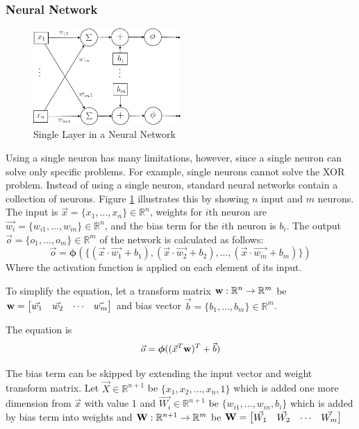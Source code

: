 \documentclass[draft,dvipsnames]{drexel-thesis}
\begin{document}
\begin{thesis}
\subsubsection{Neural Network}\label{subsubsec:NN}

\begin{figure}[t!]
    \centering
    \includegraphics[width=0.5\textwidth]{pictures/figures/detail_NN.png}
    \caption{Single Layer in a Neural Network}
    \label{fig:detail_NN}
\end{figure}

Using a single neuron has many limitations, however, since a single neuron can solve only specific problems. For example, single neurons cannot solve the XOR problem. Instead of using a single neuron, standard neural networks contain a collection of neurons. Figure \ref{fig:detail_NN} illustrates this by showing $n$ input and $m$ neurons. The input is $\vec{x} = \{x_1, ..., x_n\} \in \mathbb{R}^n$, weights for $i$th neuron are $\vec{w_i} = \{w_{i1}, ..., w_{in}\} \in \mathbb{R}^n$, and the bias term for the $i$th neuron is $b_i$. The output $\vec{o} = \{o_1, ..., o_m\} \in \mathbb{R}^m$ of the network is calculated as follows:
$$\vec{o} = \bm{\phi}(\{(\vec{x}\cdot\vec{w_1}+b_1),(\vec{x}\cdot\vec{w_2}+b_2),...,(\vec{x}\cdot\vec{w_m}+b_m)\})$$
Where the activation function is applied on each element of its input.

To simplify the equation, let a transform matrix $\bold{w}: \mathbb{R}^n \rightarrow \mathbb{R}^m$ be
$\bold{w}=
\begin{bmatrix}
	\vec{w_1} & \vec{w_2} & \cdots & \vec{w_m}
\end{bmatrix}$
and bias vector $\vec{b} = \{b_1, ..., b_m\} \in \mathbb{R}^m$.

The equation is
$$\vec{o} = \bm{\phi}((\vec{x}^T\bold{w})^T+\vec{b})$$

The bias term can be skipped by extending the input vector and weight transform matrix. Let $\vec{X} \in \mathbb{R}^{n+1}$ be $\{x_1, x_2, ..., x_n, 1\}$ which is added one more dimension from $\vec{x}$ with value 1 and $\vec{W_i} \in \mathbb{R}^{n+1}$ be $\{w_{i1}, ..., w_{in}, b_i\}$ which is added by bias term into weights and $\bold{W}: \mathbb{R}^{n+1} \rightarrow \mathbb{R}^m$ be
$\bold{W}=
\begin{bmatrix}
	\vec{W_1} & \vec{W_2} & \cdots & \vec{W_m}
\end{bmatrix}$


\end{thesis}
\end{document}
